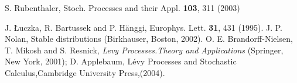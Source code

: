 \documentclass[authoryear,draft,1p,times]{elsarticle}
\renewcommand{\=}{\stackrel{\mathrm{d}}{=}}
\begin{document}
\begin{thebibliography}{99}
 S. Rubenthaler, Stoch. Processes and their Appl. {\bf 103}, 311 (2003)

 J. {\L}uczka, R. Bartussek and P. H\"anggi, Europhys. Lett. 
{\bf 31}, 431 (1995). 
 J. P. Nolan, Stable distributions (Birkhauser, Boston, 2002). 
 O. E. Brandorff-Nielsen, T. Mikosh and S. Resnick, 
{\it Levy Processes.Theory and Applications} (Springer, New York, 2001); 
D. Applebaum, Lévy Processes and Stochastic Calculus,Cambridge University Press,(2004).
\end{thebibliography}

 
\end{document}
